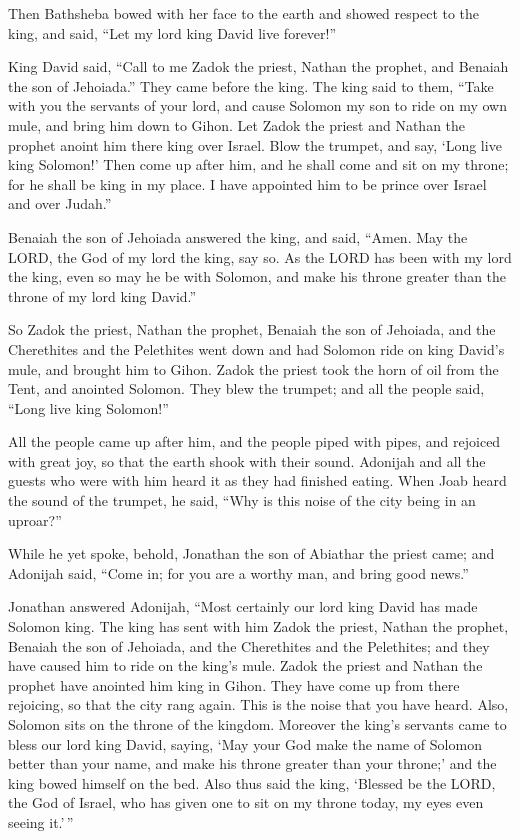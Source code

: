  Then Bathsheba bowed with her face to the earth and showed
respect to the king, and said, ``Let my lord king David live forever!''

 King David said, ``Call to me Zadok the priest, Nathan the
prophet, and Benaiah the son of Jehoiada.'' They came before the king.
 The king said to them, ``Take with you the servants of
your lord, and cause Solomon my son to ride on my own mule, and bring
him down to Gihon.  Let Zadok the priest and Nathan the
prophet anoint him there king over Israel. Blow the trumpet, and say,
`Long live king Solomon!'  Then come up after him, and he
shall come and sit on my throne; for he shall be king in my place. I
have appointed him to be prince over Israel and over Judah.''

 Benaiah the son of Jehoiada answered the king, and said,
``Amen. May the LORD, the God of my lord the king, say so. 
As the LORD has been with my lord the king, even so may he be with
Solomon, and make his throne greater than the throne of my lord king
David.''

 So Zadok the priest, Nathan the prophet, Benaiah the son
of Jehoiada, and the Cherethites and the Pelethites went down and had
Solomon ride on king David's mule, and brought him to Gihon.
 Zadok the priest took the horn of oil from the Tent, and
anointed Solomon. They blew the trumpet; and all the people said, ``Long
live king Solomon!''

 All the people came up after him, and the people piped
with pipes, and rejoiced with great joy, so that the earth shook with
their sound.  Adonijah and all the guests who were with him
heard it as they had finished eating. When Joab heard the sound of the
trumpet, he said, ``Why is this noise of the city being in an uproar?''

 While he yet spoke, behold, Jonathan the son of Abiathar
the priest came; and Adonijah said, ``Come in; for you are a worthy man,
and bring good news.''

 Jonathan answered Adonijah, ``Most certainly our lord king
David has made Solomon king.  The king has sent with him
Zadok the priest, Nathan the prophet, Benaiah the son of Jehoiada, and
the Cherethites and the Pelethites; and they have caused him to ride on
the king's mule.  Zadok the priest and Nathan the prophet
have anointed him king in Gihon. They have come up from there rejoicing,
so that the city rang again. This is the noise that you have heard.
 Also, Solomon sits on the throne of the kingdom.
 Moreover the king's servants came to bless our lord king
David, saying, `May your God make the name of Solomon better than your
name, and make his throne greater than your throne;' and the king bowed
himself on the bed.  Also thus said the king, `Blessed be
the LORD, the God of Israel, who has given one to sit on my throne
today, my eyes even seeing it.'\,''

